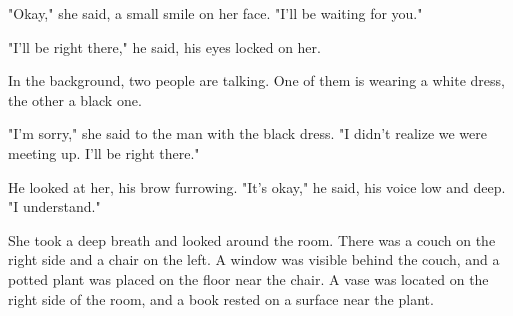 \documentclass[smalldemyvopaper,11pt,twoside,onecolumn,openright,extrafontsizes]{memoir}
\begin{document}
"Okay," she said, a small smile on her face. "I'll be waiting for you."\par
"I'll be right there," he said, his eyes locked on her.\par
In the background, two people are talking. One of them is wearing a white dress, the other a black one.\par
"I'm sorry," she said to the man with the black dress. "I didn't realize we were meeting up. I'll be right there."\par
He looked at her, his brow furrowing. "It's okay," he said, his voice low and deep. "I understand."\par
She took a deep breath and looked around the room. There was a couch on the right side and a chair on the left. A window was visible behind the couch, and a potted plant was placed on the floor near the chair. A vase was located on the right side of the room, and a book rested on a surface near the plant.\par
\end{document}
